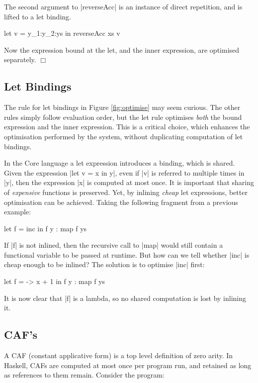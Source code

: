 \documentclass{llncs}
\newcommand{\noexample}{\hfill$\Box$}
\begin{document}
\noindent The second argument to |reverseAcc| is an instance of direct repetition, and is lifted to a let binding.

\begin{code}
let v = y_1:y_2:ys
in reverseAcc xs v
\end{code}

\noindent Now the expression bound at the let, and the inner expression, are optimised separately. \noexample


\subsection{Let Bindings}
\label{sec:let}

The rule for let bindings in Figure \ref{fig:optimise} may seem curious. The other rules simply follow evaluation order, but the let rule optimises \textit{both} the bound expression and the inner expression. This is a critical choice, which enhances the optimisation performed by the system, without duplicating computation of let bindings.

In the Core language a let expression introduces a binding, which is shared. Given the expression |let v = x in y|, even if |v| is referred to multiple times in |y|, then the expression |x| is computed at most once. It is important that sharing of \textit{expensive} functions is preserved. Yet, by inlining \textit{cheap} let expressions, better optimisation can be achieved. Taking the following fragment from a previous example:

\begin{code}
let f = inc
in f y : map f ys
\end{code}

If |f| is not inlined, then the recursive call to |map| would still contain a functional variable to be passed at runtime. But how can we tell whether |inc| is cheap enough to be inlined? The solution is to optimise |inc| first:

\begin{code}
let f = \x -> x + 1
in f y : map f ys
\end{code}

It is now clear that |f| is a lambda, so no shared computation is lost by inlining it.

\subsection{CAF's}
\label{sec:caf}

A CAF (constant applicative form) is a top level definition of zero arity. In Haskell, CAFs are computed at most once per program run, and retained as long as references to them remain. Consider the program:
\end{document}
